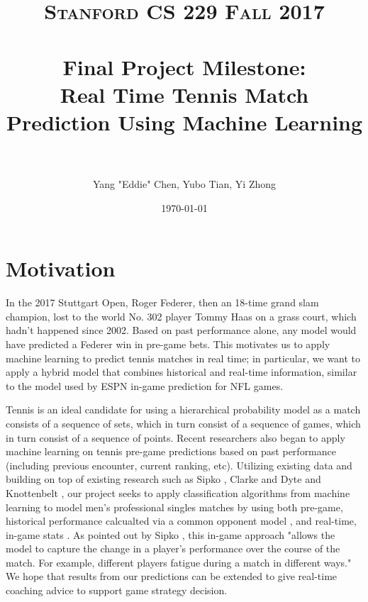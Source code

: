 \documentclass[paper=a4, fontsize=11pt]{scrartcl} %
\title{	
\normalfont \normalsize 
\textsc{Stanford CS 229 Fall 2017} \\ [25pt] %
\horrule{0.5pt} \\[0.4cm] %
\Large Final Project Milestone: \\
\Large Real Time Tennis Match Prediction Using Machine Learning\\ %
\horrule{2pt} \\[0.5cm] %
}
\author{Yang "Eddie" Chen, Yubo Tian, Yi Zhong} %
\date{\normalsize\today} %
\numberwithin{equation}{section} %
\numberwithin{figure}{section} %
\numberwithin{table}{section} %
\begin{document}
\maketitle %


\section{Motivation}
In the 2017 Stuttgart Open, Roger Federer, then an 18-time grand slam champion, lost to the world No. 302 player Tommy Haas on a grass court, which hadn't happened since 2002.  Based on past performance alone, any model would have predicted a Federer win in pre-game bets. This motivates us to apply machine learning to predict tennis matches in real time; in particular, we want to apply a hybrid model that combines historical and real-time information, similar to the model used by ESPN in-game prediction for NFL games.

Tennis is an ideal candidate for using a hierarchical probability model as a match consists of a sequence of sets, which in turn consist of a sequence of games, which in turn consist of a sequence of points.  Recent researchers also began to apply machine learning on tennis pre-game predictions based on past performance (including previous encounter, current ranking, etc). Utilizing existing data and building on top of existing research such as Sipko \cite{tennis1}, Clarke and Dyte \cite{Clarke2010} and Knottenbelt \cite{KNOTTENBELT20123820}, our project seeks to apply classification algorithms from machine learning to model men's professional singles matches by using both pre-game, historical performance calcualted via a common opponent model \cite{KNOTTENBELT20123820}, and real-time, in-game stats \cite{tennis_charting} \cite{tennis2setbyset}. As pointed out by Sipko \cite{tennis1}, this in-game approach "allows the model to capture the change in a player's performance over the course of the match. For example, different players fatigue during a match in different ways." We hope that results from our predictions can be extended to give real-time coaching advice to support game strategy decision.
\end{document}
